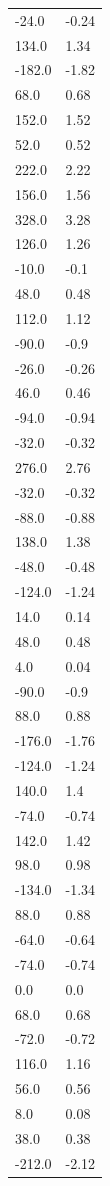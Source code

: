 \begin{longtable}{ll}
-24.0 & -0.24 \\
134.0 & 1.34 \\
-182.0 & -1.82 \\
68.0 & 0.68 \\
152.0 & 1.52 \\
52.0 & 0.52 \\
222.0 & 2.22 \\
156.0 & 1.56 \\
328.0 & 3.28 \\
126.0 & 1.26 \\
-10.0 & -0.1 \\
48.0 & 0.48 \\
112.0 & 1.12 \\
-90.0 & -0.9 \\
-26.0 & -0.26 \\
46.0 & 0.46 \\
-94.0 & -0.94 \\
-32.0 & -0.32 \\
276.0 & 2.76 \\
-32.0 & -0.32 \\
-88.0 & -0.88 \\
138.0 & 1.38 \\
-48.0 & -0.48 \\
-124.0 & -1.24 \\
14.0 & 0.14 \\
48.0 & 0.48 \\
4.0 & 0.04 \\
-90.0 & -0.9 \\
88.0 & 0.88 \\
-176.0 & -1.76 \\
-124.0 & -1.24 \\
140.0 & 1.4 \\
-74.0 & -0.74 \\
142.0 & 1.42 \\
98.0 & 0.98 \\
-134.0 & -1.34 \\
88.0 & 0.88 \\
-64.0 & -0.64 \\
-74.0 & -0.74 \\
0.0 & 0.0 \\
68.0 & 0.68 \\
-72.0 & -0.72 \\
116.0 & 1.16 \\
56.0 & 0.56 \\
8.0 & 0.08 \\
38.0 & 0.38 \\
-212.0 & -2.12 \\

\end{longtable}
